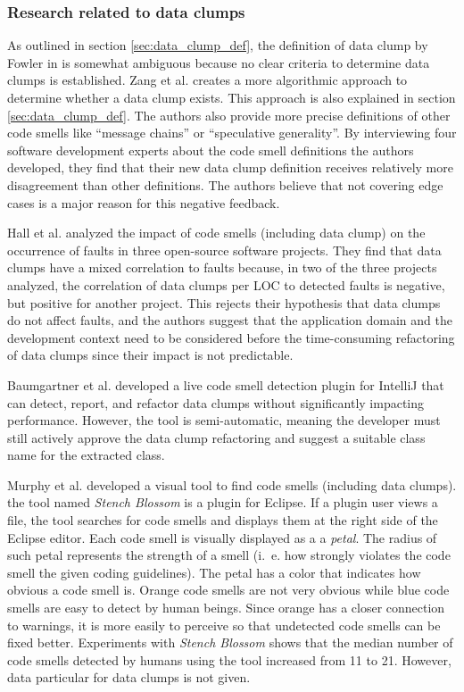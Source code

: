 \subsubsection{Research related to data clumps}

As outlined in section \ref{sec:data_clump_def}, the definition of data clump by Fowler in \cite{fowler2019refactoring} is somewhat ambiguous because no clear criteria to determine data clumps is established. Zang et al. \cite{zhangImprovingPrecisionFowler2008} creates a more algorithmic approach to determine whether a data clump exists. This approach is also explained in section \ref{sec:data_clump_def}. The authors also provide more precise definitions of other code smells like \enquote{message chains} or \enquote{speculative generality}. By interviewing four software development experts about the code smell definitions the authors developed, they find that their new data clump definition receives relatively more disagreement than other definitions. The authors believe  that not covering edge cases is a major reason for this negative feedback. 


Hall et al. analyzed the impact of code smells (including data clump) on the occurrence of faults in three open-source software projects. They find that data clumps have a mixed correlation to faults because, in two of the three projects analyzed, the correlation of data clumps per \ac{LOC} to detected faults is negative, but positive for another project. This rejects their hypothesis that data clumps do not affect faults, and the authors suggest that the application domain and the development context need to be considered before the time-consuming refactoring of data clumps since their impact is not predictable.  \cite{hallCodeSmellsHave2014}


Baumgartner et al. developed a live code smell detection plugin for IntelliJ that can detect, report, and refactor data clumps without significantly impacting performance. However, the tool is semi-automatic, meaning the developer must still actively approve the data clump refactoring and suggest a suitable class name for the extracted class. \cite{BaumgartnerAP23}

Murphy et al. \cite{stench_blossom} developed a visual tool to find code smells (including data clumps). the tool named \textit{Stench Blossom} is a plugin for Eclipse. If a plugin user views a file, the tool searches for code smells and displays them at the right side of the Eclipse editor. Each code smell is visually displayed as a a \textit{petal}. The radius of such petal represents the strength of a smell (i.~e. how strongly violates the code smell the given coding guidelines). The petal has a color that indicates how obvious a code smell is. Orange code smells are not very obvious while blue code smells are easy to detect by human beings. Since orange has a closer connection to warnings, it is more easily to perceive so that undetected code smells can be fixed better. Experiments with \textit{Stench Blossom} shows that the median number of code smells detected by humans using the tool increased from 11 to 21. However, data particular for data clumps is not given.




